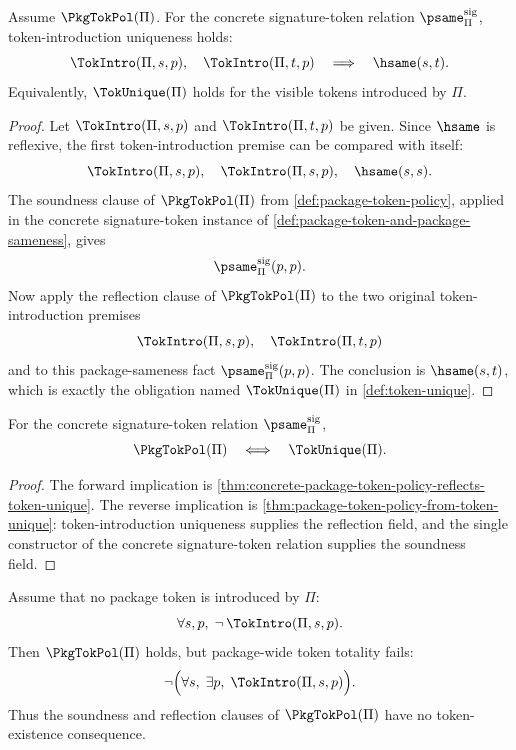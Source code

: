 \begin{theorem}
\label{thm:concrete-package-token-policy-reflects-token-unique}
Assume $\PkgTokPol(\Pi)$. For the concrete signature-token relation $\psame_{\Pi}^{\mathrm{sig}}$, token-introduction uniqueness holds:
$$
  \TokIntro(\Pi,s,p),\quad
  \TokIntro(\Pi,t,p)
  \quad\Longrightarrow\quad
  \hsame(s,t).
$$
Equivalently, $\TokUnique(\Pi)$ holds for the visible tokens introduced by $\Pi$.
\end{theorem}

\begin{proof}
Let $\TokIntro(\Pi,s,p)$ and $\TokIntro(\Pi,t,p)$ be given. Since $\hsame$ is reflexive, the first token-introduction premise can be compared with itself:
$$
  \TokIntro(\Pi,s,p),\quad
  \TokIntro(\Pi,s,p),\quad
  \hsame(s,s).
$$
The soundness clause of $\PkgTokPol(\Pi)$ from \autoref{def:package-token-policy}, applied in the concrete signature-token instance of \autoref{def:package-token-and-package-sameness}, gives
$$
  \psame_{\Pi}^{\mathrm{sig}}(p,p).
$$
Now apply the reflection clause of $\PkgTokPol(\Pi)$ to the two original token-introduction premises
$$
  \TokIntro(\Pi,s,p),\quad
  \TokIntro(\Pi,t,p)
$$
and to this package-sameness fact $\psame_{\Pi}^{\mathrm{sig}}(p,p)$. The conclusion is $\hsame(s,t)$, which is exactly the obligation named $\TokUnique(\Pi)$ in \autoref{def:token-unique}.
\end{proof}

\begin{corollary}
\label{cor:concrete-package-token-policy-iff-token-unique}
For the concrete signature-token relation $\psame_{\Pi}^{\mathrm{sig}}$,
$$
  \PkgTokPol(\Pi)
  \quad\Longleftrightarrow\quad
  \TokUnique(\Pi).
$$
\end{corollary}

\begin{proof}
The forward implication is \autoref{thm:concrete-package-token-policy-reflects-token-unique}. The reverse implication is \autoref{thm:package-token-policy-from-token-unique}: token-introduction uniqueness supplies the reflection field, and the single constructor of the concrete signature-token relation supplies the soundness field.
\end{proof}

\begin{proposition}
\label{prop:empty-introduction-separates-package-token-policy-from-token-existence}
Assume that no package token is introduced by $\Pi$:
$$
  \forall s,p,\;\neg\,\TokIntro(\Pi,s,p).
$$
Then $\PkgTokPol(\Pi)$ holds, but package-wide token totality fails:
$$
  \neg\Bigl(\forall s,\;\exists p,\;\TokIntro(\Pi,s,p)\Bigr).
$$
Thus the soundness and reflection clauses of $\PkgTokPol(\Pi)$ have no token-existence consequence.
\end{proposition}


